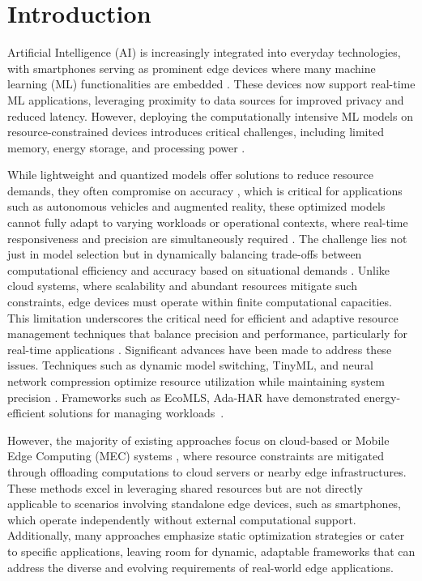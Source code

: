 \section{Introduction}

Artificial Intelligence (AI) is increasingly integrated into everyday technologies, with smartphones serving as prominent edge devices where many machine learning (ML) functionalities are embedded \cite{b1}.  These devices now support real-time ML applications, leveraging proximity to data sources for improved privacy and reduced latency. However, deploying the computationally intensive ML models on resource-constrained devices introduces critical challenges, including limited memory, energy storage, and processing power \cite{b2}.  

While lightweight and quantized models offer solutions to reduce resource demands, they often compromise on accuracy \cite{b14}\cite{b15}, which is critical for applications such as autonomous vehicles and augmented reality, these optimized models cannot fully adapt to varying workloads or operational contexts, where real-time responsiveness and precision are simultaneously required \cite{b16}\cite{b17}\cite{b18}. The challenge lies not just in model selection but in dynamically balancing trade-offs between computational efficiency and accuracy based on situational demands \cite{b3}. Unlike cloud systems, where scalability and abundant resources mitigate such constraints, edge devices must operate within finite computational capacities. This limitation underscores the critical need for efficient and adaptive resource management techniques that balance precision and performance, particularly for real-time applications \cite{b4}. Significant advances have been made to address these issues. Techniques such as dynamic model switching, TinyML, and neural network compression optimize resource utilization while maintaining system precision \cite{b5}\cite{b6}. Frameworks such as EcoMLS, Ada-HAR have demonstrated energy-efficient solutions for managing workloads~\cite{b7}\cite{b8}.

However, the majority of existing approaches focus on cloud-based or Mobile Edge Computing (MEC) systems \cite{b19}\cite{b20}\cite{b21}, where resource constraints are mitigated through offloading computations to cloud servers or nearby edge infrastructures. These methods excel in leveraging shared resources but are not directly applicable to scenarios involving standalone edge devices, such as smartphones, which operate independently without external computational support. Additionally, many approaches emphasize static optimization strategies or cater to specific applications, leaving room for dynamic, adaptable frameworks that can address the diverse and evolving requirements of real-world edge applications. 

